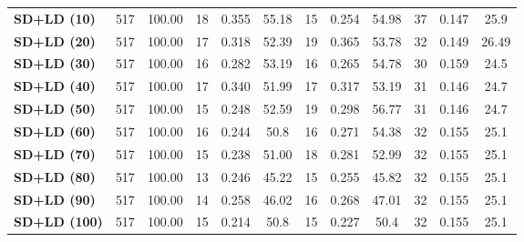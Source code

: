 \documentclass[12pt, a4paper, twoside]{report}
\begin{document}
\begin{table}[htbp]
{\begin{tabular}{|l|c|c|ccc|ccc|ccc|}
\hline
\textbf{SD+LD (10)} & 517 & 100.00 & 18 & \cellcolor[HTML]{fef9e4}0.355 & \cellcolor[HTML]{fef9e4}55.18 & 15 & 0.254 & \cellcolor[HTML]{fef9e4}54.98 & 37 & 0.147 & 25.9 \\
\textbf{SD+LD (20)} & 517 & 100.00 & 17 & 0.318 & 52.39 & 19 & \cellcolor[HTML]{fef9e4}0.365 & 53.78 & 32 & 0.149 & \cellcolor[HTML]{fef9e4}26.49 \\
\textbf{SD+LD (30)} & 517 & 100.00 & 16 & 0.282 & 53.19 & 16 & 0.265 & 54.78 & 30 & \cellcolor[HTML]{FEF9E4}0.159 & 24.5 \\
\textbf{SD+LD (40)} & 517 & 100.00 & 17 & 0.340 & 51.99 & 17 & 0.317 & 53.19 & 31 & 0.146 & 24.7 \\
\textbf{SD+LD (50)} & 517 & 100.00 & 15 & 0.248 & 52.59 & 19 & 0.298 & 56.77 & 31 & 0.146 & 24.7 \\
\textbf{SD+LD (60)} & 517 & 100.00 & 16 & 0.244 & 50.8 & 16 & 0.271 & 54.38 & 32 & 0.155 & 25.1 \\
\textbf{SD+LD (70)} & 517 & 100.00 & 15 & 0.238 & 51.00 & 18 & 0.281 & 52.99 & 32 & 0.155 & 25.1 \\
\textbf{SD+LD (80)} & 517 & 100.00 & 13 & 0.246 & 45.22 & 15 & 0.255 & 45.82 & 32 & 0.155 & 25.1 \\
\textbf{SD+LD (90)} & 517 & 100.00 & 14 & 0.258 & 46.02 & 16 & 0.268 & 47.01 & 32 & 0.155 & 25.1 \\
\textbf{SD+LD (100)} & 517 & 100.00 & 15 & 0.214 & 50.8 & 15 & 0.227 & 50.4 & 32 & 0.155 & 25.1 \\
\hline
\end{tabular}
}
\end{table}
\end{document}
